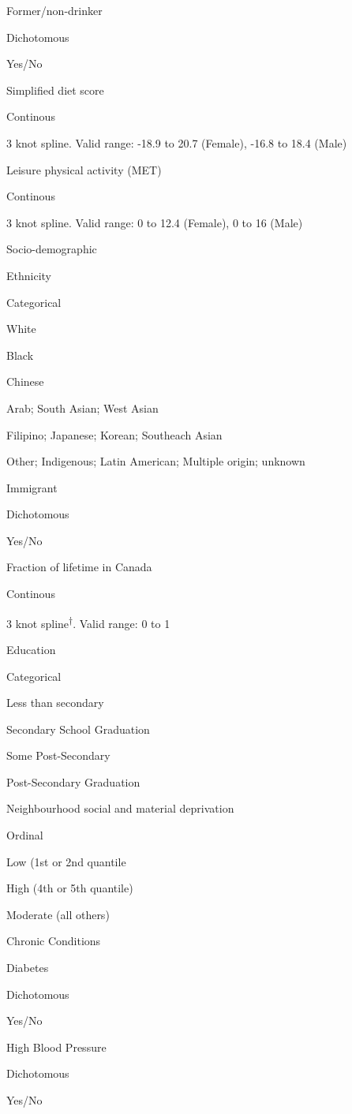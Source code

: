 \documentclass[]{book}
\begin{document}
Former/non-drinker

Dichotomous

Yes/No

Simplified diet score

Continous

3 knot spline. Valid range: -18.9 to 20.7 (Female), -16.8 to 18.4 (Male)

Leisure physical activity (MET)

Continous

3 knot spline. Valid range: 0 to 12.4 (Female), 0 to 16 (Male)

Socio-demographic

Ethnicity

Categorical

White

Black

Chinese

Arab; South Asian; West Asian

Filipino; Japanese; Korean; Southeach Asian

Other; Indigenous; Latin American; Multiple origin; unknown

Immigrant

Dichotomous

Yes/No

Fraction of lifetime in Canada

Continous

3 knot spline\textsuperscript{†}. Valid range: 0 to 1

Education

Categorical

Less than secondary

Secondary School Graduation

Some Post-Secondary

Post-Secondary Graduation

Neighbourhood social and material deprivation

Ordinal

Low (1st or 2nd quantile

High (4th or 5th quantile)

Moderate (all others)

Chronic Conditions

Diabetes

Dichotomous

Yes/No

High Blood Pressure

Dichotomous

Yes/No
\end{document}
